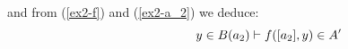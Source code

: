 \noindent
				and from (\ref{ex2-f}) and (\ref{ex2-a_2}) we deduce: \begin{equation}
				\hspace{2cm}y \in B(a_2) \vdash f([a_2], y) \in A'\label{ex2-expr2}
				\end{equation}
			